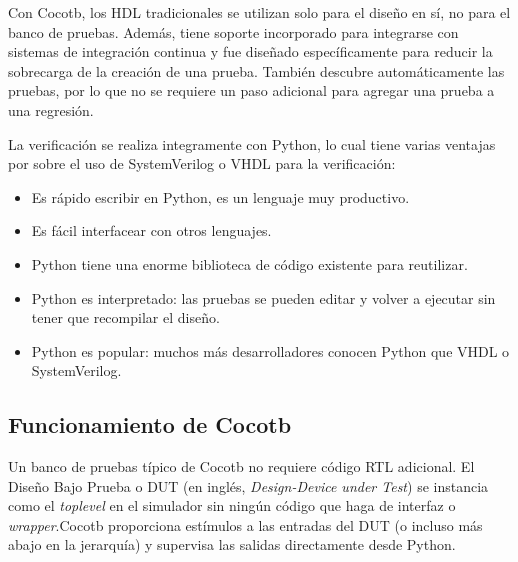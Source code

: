   Con Cocotb, los HDL tradicionales se utilizan solo para el diseño en
  sí, no para el banco de pruebas. Además, tiene soporte incorporado para
  integrarse con sistemas de integración continua y fue diseñado específicamente
  para reducir la sobrecarga de la creación de una prueba. También descubre
  automáticamente las pruebas, por lo que no se requiere un paso adicional para
  agregar una prueba a una regresión.

  La verificación se realiza integramente con Python, lo cual tiene varias
  ventajas por sobre el uso de SystemVerilog o VHDL para la verificación:

\begin{itemize}
  \item Es rápido escribir en Python, es un lenguaje muy productivo.
  \item Es fácil interfacear con otros lenguajes.
  \item Python tiene una enorme biblioteca de código existente para reutilizar.
  \item Python es interpretado: las pruebas se pueden editar y volver a ejecutar
  sin tener que recompilar el diseño.
  \item Python es popular: muchos más desarrolladores conocen Python que
  VHDL o SystemVerilog.
\end{itemize}

\subsection{Funcionamiento de Cocotb}

  Un banco de pruebas típico de Cocotb no requiere código RTL adicional.
  El Diseño Bajo Prueba o DUT (en inglés, \textit{Design-Device
  under Test}) se instancia como el \textit{toplevel} en el simulador sin ningún
  código que haga de interfaz o \textit{wrapper}.Cocotb proporciona
  estímulos a las entradas del DUT (o incluso más abajo en la jerarquía) y
  supervisa las salidas directamente desde Python.





